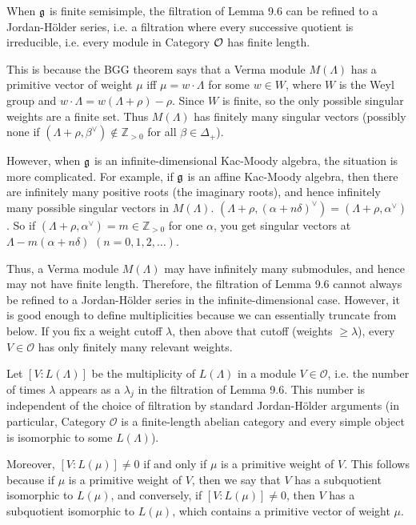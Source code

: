 \documentclass[12pt]{article}
\begin{document}
\begin{remark}
    When $\mathfrak{g}$ is finite semisimple, the filtration of Lemma 9.6 can be refined to a Jordan-Hölder series, i.e. a filtration where every successive quotient is irreducible, i.e. every module in Category ${\mathcal{O}}$ has finite length. 

    This is because the BGG theorem says that a Verma module $M(\Lambda)$ has a primitive vector of weight $\mu$ iff $\mu=w\!\cdot\!\Lambda$ for some $w\in W$, where $W$ is the Weyl group and $w\!\cdot\!\Lambda=w(\Lambda+\rho)-\rho$. Since $W$ is finite, so the only possible singular weights are a finite set. Thus $M(\Lambda)$ has finitely many singular vectors (possibly none if $(\Lambda+\rho,\beta^\vee)\notin\mathbb Z_{>0}$ for all $\beta\in\Delta_+$).
	
    
    However, when $\mathfrak{g}$ is an infinite-dimensional Kac-Moody algebra, the situation is more complicated. For example, if $\mathfrak{g}$ is an affine Kac-Moody algebra, then there are infinitely many positive roots (the imaginary roots), and hence infinitely many possible singular vectors in $M(\Lambda)$.
    $(\Lambda+\rho,(\alpha+n\delta)^\vee)=(\Lambda+\rho,\alpha^\vee)$. So if $(\Lambda+\rho,\alpha^\vee)=m\in\mathbb{Z}_{>0}$ for one $\alpha$, you get singular vectors at $\Lambda-m(\alpha+n\delta)$ $(n=0,1,2,\dots)$.


    Thus, a Verma module $M(\Lambda)$ may have infinitely many submodules, and hence may not have finite length. Therefore, the filtration of Lemma 9.6 cannot always be refined to a Jordan-Hölder series in the infinite-dimensional case. However, it is good enough to define multiplicities because we can essentially truncate from below. If you fix a weight cutoff $\lambda$, then above that cutoff (weights $\geq \lambda$), every $V\in\mathcal O$ has only finitely many relevant weights.
\end{remark}

Let $[V:L(\Lambda)]$ be the multiplicity of $L(\Lambda)$ in a module $V \in \mathcal{O}$, i.e. the number of times $\lambda$ appears as a $\lambda_j$ in the filtration of Lemma 9.6. This number is independent of the choice of filtration by standard Jordan-Hölder arguments (in particular, Category $\mathcal{O}$ is a finite-length abelian category and every simple object is isomorphic to some $L(\Lambda)$).

Moreover, $[V:L(\mu)] \neq 0$ if and only if $\mu$ is a primitive weight of $V$. This follows because if $\mu$ is a primitive weight of $V$, then we say that $V$ has a subquotient isomorphic to $L(\mu)$, and conversely, if $[V:L(\mu)] \neq 0$, then $V$ has a subquotient isomorphic to $L(\mu)$, which contains a primitive vector of weight $\mu$.
\end{document}
